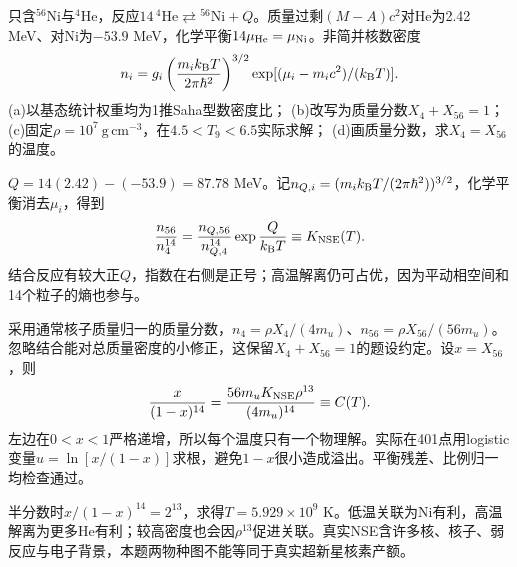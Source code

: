 \begin{exercise}
只含$^{56}$Ni与$^4$He，反应$14\,{}^4\mathrm{He}\rightleftarrows{}^{56}\mathrm{Ni}+Q$。质量过剩$(M-A)c^2$对He为2.42 MeV、对Ni为$-53.9$ MeV，化学平衡$14\mu_{\rm He}=\mu_{\rm Ni}$。非简并核数密度
\[
 n_i=g_i\left(\frac{m_ik_{\mathrm B} T}{2\pi\hbar^2}\right)^{3/2}
 \exp[(\mu_i-m_ic^2)/(k_{\mathrm B} T)].
\]
(a)以基态统计权重均为1推Saha型数密度比；
(b)改写为质量分数$X_4+X_{56}=1$；
(c)固定$\rho=10^7\ \mathrm{g\,cm^{-3}}$，在$4.5<T_9<6.5$实际求解；
(d)画质量分数，求$X_4=X_{56}$的温度。
\end{exercise}
\begin{solution}
$Q=14(2.42)-(-53.9)=87.78$ MeV。记$n_{Q,i}=(m_ik_{\mathrm B} T/(2\pi\hbar^2))^{3/2}$，化学平衡消去$\mu_i$，得到
\[
 \frac{n_{56}}{n_4^{14}}
 =\frac{n_{Q,56}}{n_{Q,4}^{14}}\exp\frac Q{k_{\mathrm B} T}
 \equiv K_{\rm NSE}(T).
\]
结合反应有较大正$Q$，指数在右侧是正号；高温解离仍可占优，因为平动相空间和14个粒子的熵也参与。

采用通常核子质量归一的质量分数，$n_4=\rho X_4/(4m_u)$、$n_{56}=\rho X_{56}/(56m_u)$。忽略结合能对总质量密度的小修正，这保留$X_4+X_{56}=1$的题设约定。设$x=X_{56}$，则
\[
 \frac{x}{(1-x)^{14}}
 =\frac{56m_uK_{\rm NSE}\rho^{13}}{(4m_u)^{14}}\equiv C(T).
\]
左边在$0<x<1$严格递增，所以每个温度只有一个物理解。实际在401点用logistic变量$u=\ln[x/(1-x)]$求根，避免$1-x$很小造成溢出。平衡残差、比例归一均检查通过。
\begin{center}\end{center}
半分数时$x/(1-x)^{14}=2^{13}$，求得$T=5.929\times10^9$ K。低温关联为Ni有利，高温解离为更多He有利；较高密度也会因$\rho^{13}$促进关联。真实NSE含许多核、核子、弱反应与电子背景，本题两物种图不能等同于真实超新星核素产额。
\end{solution}

